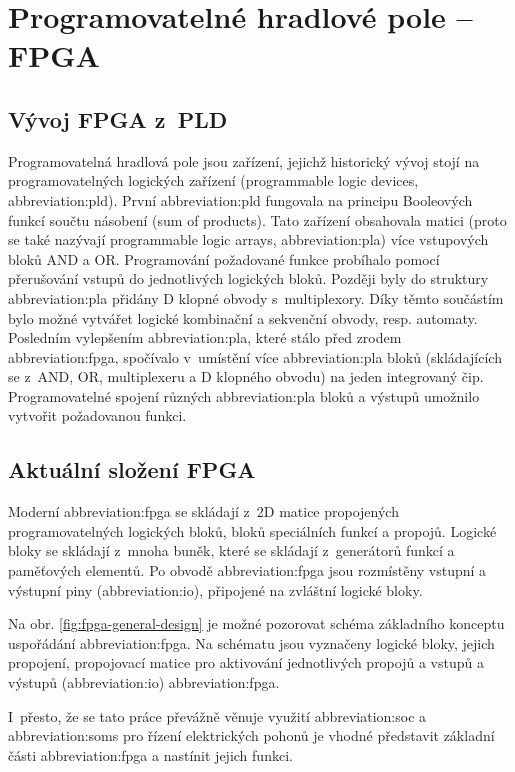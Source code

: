\documentclass[a4paper, twoside, 11pt]{article}
\begin{document}
	\section{Programovatelné hradlové pole – FPGA}
		\subsection{Vývoj FPGA z~PLD}
		Programovatelná hradlová pole jsou zařízení, jejichž historický vývoj stojí na programovatelných logických zařízení (programmable logic devices, \gls{abbreviation:pld}). První \gls{abbreviation:pld} fungovala na principu Booleových funkcí součtu násobení (sum of products). Tato zařízení obsahovala matici (proto se také nazývají programmable logic arrays, \gls{abbreviation:pla}) více vstupových bloků AND a OR. Programování požadované funkce probíhalo pomocí přerušování vstupů do jednotlivých logických bloků. Později byly do struktury \gls{abbreviation:pla} přidány D klopné obvody s~multiplexory. Díky těmto součástím bylo možné vytvářet logické kombinační a sekvenční obvody, resp. automaty. Posledním vylepšením \gls{abbreviation:pla}, které stálo před zrodem \gls{abbreviation:fpga}, spočívalo v~umístění více \gls{abbreviation:pla} bloků (skládajících se z~AND, OR, multiplexeru a D klopného obvodu) na jeden integrovaný čip. Programovatelné spojení různých \gls{abbreviation:pla} bloků a výstupů umožnilo vytvořit požadovanou funkci. \cite{Sass2010}\par

		\subsection{Aktuální složení FPGA}
		Moderní \gls{abbreviation:fpga} se skládají z~2D matice propojených programovatelných logických bloků, bloků speciálních funkcí a propojů. Logické bloky se skládají z~mnoha buněk, které se skládají z~generátorů funkcí a paměťových elementů. Po obvodě \gls{abbreviation:fpga} jsou rozmístěny vstupní a výstupní piny (\gls{abbreviation:io}), připojené na zvláštní logické bloky. \cite{Sass2010}\par
		Na obr. \ref{fig:fpga-general-design} je možné pozorovat schéma základního konceptu uspořádání \gls{abbreviation:fpga}. Na schématu jsou vyznačeny logické bloky, jejich propojení, propojovací matice pro aktivování jednotlivých propojů a vstupů a výstupů (\gls{abbreviation:io}) \gls{abbreviation:fpga}.\par
		I~přesto, že se tato práce převážně věnuje využití \gls{abbreviation:soc} a \gls{abbreviation:soms} pro řízení elektrických pohonů je vhodné představit základní části \gls{abbreviation:fpga} a nastínit jejich funkci.
\end{document}
